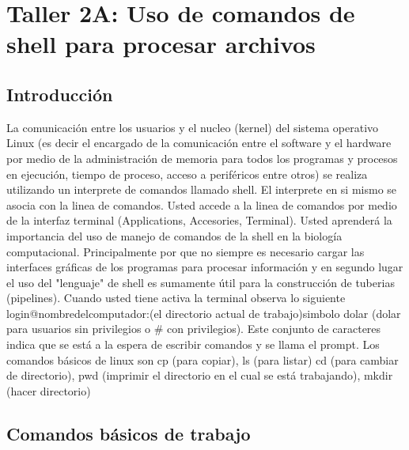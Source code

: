 \documentclass[10pt]{article}
\begin{document}
\section{Taller 2A: Uso de comandos de shell para procesar archivos}

\subsection{Introducción}

La comunicación entre los usuarios y el nucleo (kernel) del sistema operativo Linux (es decir el encargado de la comunicación entre el software y el hardware 
por medio de la administración de  memoria para todos los programas y procesos en ejecución, tiempo de proceso, acceso a periféricos entre otros) se realiza 
utilizando un interprete de comandos llamado shell. El interprete en si mismo se asocia con la linea de comandos. Usted accede a la linea de comandos por medio de 
la interfaz terminal (Applications, Accesories, Terminal). Usted aprenderá la importancia del uso de manejo de comandos de la shell en la biología computacional. 
Principalmente por que no siempre es necesario cargar las interfaces gráficas de los programas para procesar información y en segundo lugar el uso del 
"lenguaje" de shell es sumamente útil para la construcción de tuberias (pipelines). 
Cuando usted tiene activa la terminal observa lo siguiente login@nombredelcomputador:(el directorio actual de trabajo)simbolo dolar (dolar para usuarios sin privilegios o \# con privilegios). 
Este conjunto de caracteres indica que se está a la espera de escribir comandos y se llama el prompt. Los comandos básicos de linux son cp (para copiar), ls (para listar) cd (para cambiar de directorio), pwd (imprimir el directorio en el cual se está trabajando), mkdir (hacer directorio)


\subsection{Comandos básicos de trabajo}
\end{document}
